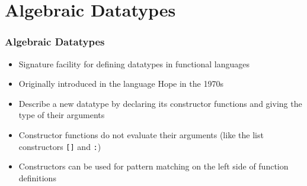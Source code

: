 \documentclass{beamer}
\begin{document}
\section{Algebraic Datatypes}
\begin{frame}
  \frametitle{Algebraic Datatypes}
  \begin{itemize}
  \item Signature facility for defining datatypes in functional
    languages
  \item Originally introduced in the language Hope in the 1970s
  \item Describe a new datatype by declaring its \alert{constructor function}s and
    giving the type of their arguments
  \item Constructor functions do not evaluate their arguments (like the list
    constructors \lstinline{[]} and \lstinline{:})
  \item Constructors can be used for \alert{pattern matching} on the left side of
    function definitions
  \end{itemize}
\end{frame}
\end{document}
